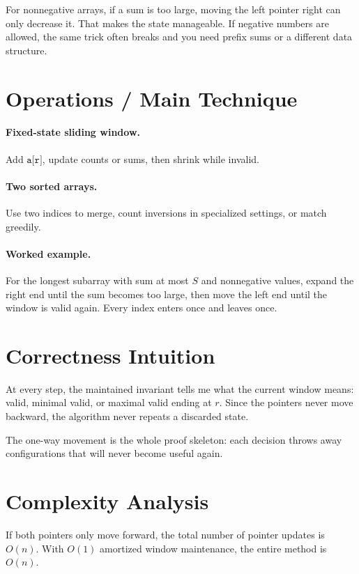 For nonnegative arrays, if a sum is too large, moving the left pointer right can only decrease it. That makes the
state manageable. If negative numbers are allowed, the same trick often breaks and you need prefix sums or a different
data structure.

\section*{Operations / Main Technique}

\paragraph{Fixed-state sliding window.}
Add \(\texttt{a[r]}\), update counts or sums, then shrink while invalid.

\paragraph{Two sorted arrays.}
Use two indices to merge, count inversions in specialized settings, or match greedily.

\paragraph{Worked example.}
For the longest subarray with sum at most \(S\) and nonnegative values, expand the right end until the sum becomes too
large, then move the left end until the window is valid again. Every index enters once and leaves once.

\section*{Correctness Intuition}

At every step, the maintained invariant tells me what the current window means: valid, minimal valid, or maximal valid
ending at \(r\). Since the pointers never move backward, the algorithm never repeats a discarded state.

The one-way movement is the whole proof skeleton: each decision throws away configurations that will never become useful
again.

\section*{Complexity Analysis}

If both pointers only move forward, the total number of pointer updates is \(O(n)\). With \(O(1)\) amortized window
maintenance, the entire method is \(O(n)\).

